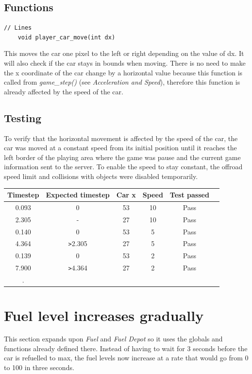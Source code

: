 \documentclass{article}
\begin{document}
\subsection*{Functions}
\begin{lstlisting}[style=CStyle]
	// Lines
	void player_car_move(int dx)
\end{lstlisting}
This moves the car one pixel to the left or right depending on the value of dx. It will also check if the car stays in bounds when moving. There is no need to make the x coordinate of the car change by a horizontal value because this function is called from \emph{game\_step()} (see \emph{Acceleration and Speed}), therefore this function is already affected by the speed of the car.
\newline

\subsection*{Testing}
To verify that the horizontal movement is affected by the speed of the car, the car was moved at a constant speed from its initial position until it reaches the left border of the playing area where the game was pause and the current game information sent to the server. To enable the speed to stay constant, the offroad speed limit and collisions with objects were disabled temporarily.
\begin{center}
\begin{tabular}{ c c c c c c }
Timestep	& Expected timestep	& Car x 	& Speed	& Test passed	\\ \hline
0.093		& 0				& 53		& 10		& Pass		\\
2.305		& - 				& 27		& 10		& Pass		\\
0.140		& 0				& 53		& 5		& Pass		\\
4.364		& \verb|>|2.305		& 27		& 5		& Pass		\\
0.139		& 0				& 53		& 2		& Pass		\\
7.900		& \verb|>|4.364		& 27		& 2		& Pass		\\ \hline.
\end{tabular}
\end{center}

\clearpage

\section{Fuel level increases gradually}
This section expands upon \emph{Fuel} and \emph{Fuel Depot}  so it uses the globals and functions already defined there. Instead of having to wait for 3 seconds before the car is refuelled to max, the fuel levels now increase at a rate that would go from 0 to 100 in three seconds.  
\end{document}
